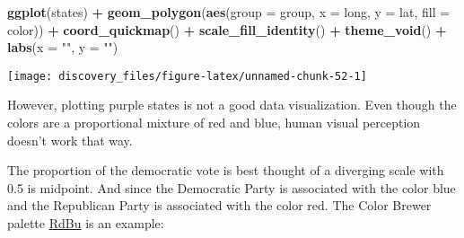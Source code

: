 \documentclass[]{book}
\newenvironment{Shaded}{\begin{snugshade}}{\end{snugshade}}
\newcommand{\KeywordTok}[1]{\textcolor[rgb]{0.13,0.29,0.53}{\textbf{#1}}}
\newcommand{\DataTypeTok}[1]{\textcolor[rgb]{0.13,0.29,0.53}{#1}}
\newcommand{\DecValTok}[1]{\textcolor[rgb]{0.00,0.00,0.81}{#1}}
\newcommand{\StringTok}[1]{\textcolor[rgb]{0.31,0.60,0.02}{#1}}
\newcommand{\OperatorTok}[1]{\textcolor[rgb]{0.81,0.36,0.00}{\textbf{#1}}}
\newcommand{\NormalTok}[1]{#1}
\theoremstyle{definition}
\theoremstyle{definition}
\theoremstyle{definition}
\theoremstyle{remark}
\begin{document}
\begin{Shaded}
\begin{Highlighting}[]
\KeywordTok{ggplot}\NormalTok{(states) }\OperatorTok{+}
\StringTok{  }\KeywordTok{geom_polygon}\NormalTok{(}\KeywordTok{aes}\NormalTok{(}\DataTypeTok{group =}\NormalTok{ group, }\DataTypeTok{x =}\NormalTok{ long, }\DataTypeTok{y =}\NormalTok{ lat,}
                   \DataTypeTok{fill =}\NormalTok{ color)) }\OperatorTok{+}
\StringTok{  }\KeywordTok{coord_quickmap}\NormalTok{() }\OperatorTok{+}
\StringTok{  }\KeywordTok{scale_fill_identity}\NormalTok{() }\OperatorTok{+}
\StringTok{  }\KeywordTok{theme_void}\NormalTok{() }\OperatorTok{+}
\StringTok{  }\KeywordTok{labs}\NormalTok{(}\DataTypeTok{x =} \StringTok{""}\NormalTok{, }\DataTypeTok{y =} \StringTok{""}\NormalTok{)}
\end{Highlighting}
\end{Shaded}

\begin{center}\texttt{[image: discovery\_files/figure-latex/unnamed-chunk-52-1]} \end{center}

However, plotting purple states is not a good data visualization. Even
though the colors are a proportional mixture of red and blue, human
visual perception doesn't work that way.

The proportion of the democratic vote is best thought of a diverging
scale with 0.5 is midpoint. And since the Democratic Party is associated
with the color blue and the Republican Party is associated with the
color red. The Color Brewer palette
\href{http://colorbrewer2.org/\#type=diverging\&scheme=RdBu\&n=11}{RdBu}
is an example:

\begin{Shaded}
\end{Shaded}
\end{document}
